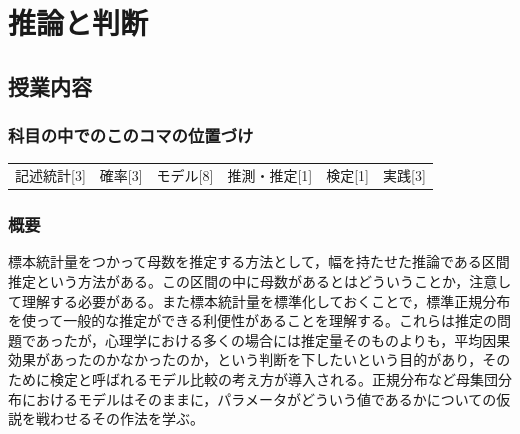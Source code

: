 \section{推論と判断}
\label{s17_estimation_and_test}

\subsection{授業内容}
\subsubsection{科目の中でのこのコマの位置づけ}
\begin{tabular}[t]{cccccc}
	記述統計[3] & 確率[3] & モデル[8] & 推測・推定[1] & 検定[1] & 実践[3]
\end{tabular}
\subsubsection{概要}
標本統計量をつかって母数を推定する方法として，幅を持たせた推論である区間推定という方法がある。この区間の中に母数があるとはどういうことか，注意して理解する必要がある。また標本統計量を標準化しておくことで，標準正規分布を使って一般的な推定ができる利便性があることを理解する。これらは推定の問題であったが，心理学における多くの場合には推定量そのものよりも，平均因果効果があったのかなかったのか，という判断を下したいという目的があり，そのために検定と呼ばれるモデル比較の考え方が導入される。正規分布など母集団分布におけるモデルはそのままに，パラメータがどういう値であるかについての仮説を戦わせるその作法を学ぶ。
